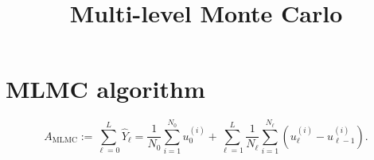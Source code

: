 \documentclass[final,3p,times,11pt]{elsarticle}
\begin{document}
\begin{frontmatter}
\title{Multi-level Monte Carlo}


\begin{abstract}
\end{abstract}

\begin{keyword}
%
\MSC[2020] 
\end{keyword}
\end{frontmatter}

\section{MLMC algorithm}
%
\begin{equation}
\label{eq:MLMC_estimator}
    A_{\text{MLMC}} := \sum_{\ell=0}^L \widehat{Y}_\ell=\frac{1}{N_0}\sum_{i=1}^{N_0}u_0^{(i)} + \sum_{\ell = 1}^L \frac{1}{N_\ell}\sum_{i=1}^{N_\ell}\left(u_\ell^{(i)} - u_{\ell-1}^{(i)}\right).
\end{equation}
%
\end{document}
